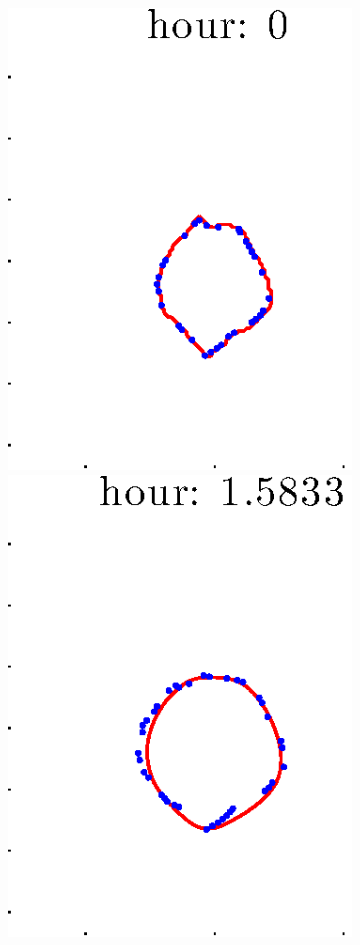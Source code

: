 \documentclass[12pt]{article}
\begin{document}
\begin{figure}[h!]
\begin{subfigure}[b]{.3\textwidth}
	\end{subfigure}
	\begin{subfigure}[b]{.3\textwidth}
	\centering
		\includegraphics[height=.15\textheight]{Pos14exp8/full/second1.eps}
		\includegraphics[height=.15\textheight]{Pos14exp8/full/second2.eps}

\end{subfigure}
\end{figure}
\end{document}
